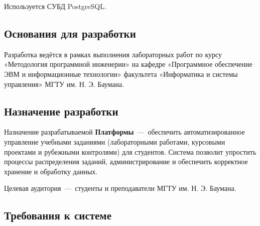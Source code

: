 Используется СУБД PostgreSQL.


\subsection*{Основания для разработки}

Разработка ведётся в рамках выполнения лабораторных работ по курсу
«Методология программной инженерии» на кафедре «Программное обеспечение ЭВМ и информационные технологии» факультета «Информатика и
системы управления» МГТУ им. Н. Э. Баумана.

\subsection*{Назначение разработки}

Назначение разрабатываемой \textbf{Платформы}~---~обеспечить автоматизированное управление учебными заданиями (лабораторными работами, курсовыми проектами и рубежными контролями) для студентов. Система позволит упростить процессы распределения заданий, администрирование и обеспечить корректное хранение и обработку данных. 

Целевая аудитория~---~студенты и преподаватели
МГТУ им. Н. Э. Баумана.

\subsection*{Требования к системе}

